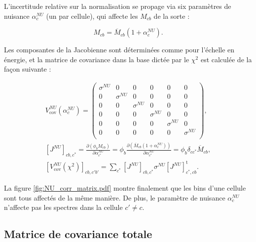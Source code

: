 \bigbreak

L'incertitude relative sur la normalisation se propage via six paramètres de nuisance $\alpha^{NU}_c$ (un par cellule), qui affecte les $M_{cb}$ de la sorte :

\begin{equation}
    M_{cb} = \overline{M}_{cb}(1 + \alpha_c^{NU}).
\end{equation}

\bigbreak

Les composantes de la Jacobienne sont déterminées comme pour l'échelle en énergie, et la matrice de covariance dans la base dictée par le $\chi^2$ est calculée de la façon suivante :

\begin{equation}
\begin{gathered}
V_\textrm{cov}^{NU}\left(\alpha^{NU}_c\right) = \left(\begin{matrix}
        \sigma^{NU} & 0 & 0 & 0 & 0 & 0 \\
        0 & \sigma^{NU} & 0 & 0 & 0 & 0 \\
        0 & 0 & \sigma^{NU} & 0 & 0 & 0 \\
        0 & 0 & 0 & \sigma^{NU} & 0 & 0 \\
        0 & 0 & 0 & 0 & \sigma^{NU} & 0 \\
        0 & 0 & 0 & 0 & 0 & \sigma^{NU} \\
    \end{matrix} \right),\\
\left[J^{NU}\right]_{cb,c^*} = \frac{\partial \left(\phi_bM_{cb}\right)}{\partial \alpha^{NU}_{c^*}} = \phi_b \frac{\partial \left(\overline{M}_{cb}(1 + \alpha^{NU}_c)\right)}{\partial \alpha^{NU}_{c^*}} = \phi_b \delta_{cc^*} \overline{M}_{cb},\\
\left[V_\textrm{cov}^{NU}\left(\chi^2\right)\right]_{cb,c'b'} = \sum_{c^*} \left[J^{NU}\right]_{cb,c^*} \sigma^{NU} \left[J^{NU}\right]^\textrm{t}_{c^*,cb}.
\end{gathered}
\end{equation}

\bigbreak

La figure \ref{fig:NU_corr_matrix.pdf} montre finalement que les bins d'une cellule sont tous affectés de la même manière. De plus, le paramètre de nuisance $\alpha^{NU}_c$ n'affecte pas les spectres dans la cellule $c' \neq c$.

\bigbreak

\subsection{Matrice de covariance totale}
\label{seq:incert_propag}

